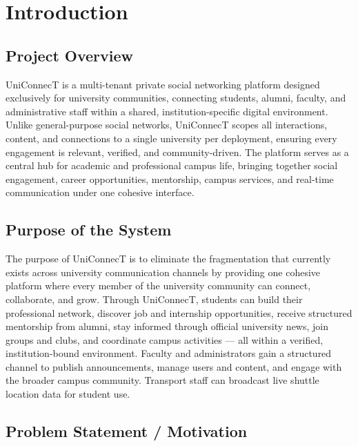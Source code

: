 \documentclass[12pt, a4paper]{article}
\begin{document}
\section{Introduction}

\subsection{Project Overview}

UniConnecT is a multi-tenant private social networking platform designed exclusively for
university communities, connecting students, alumni, faculty, and administrative staff
within a shared, institution-specific digital environment. Unlike general-purpose social
networks, UniConnecT scopes all interactions, content, and connections to a single
university per deployment, ensuring every engagement is relevant, verified, and
community-driven. The platform serves as a central hub for academic and professional
campus life, bringing together social engagement, career opportunities, mentorship,
campus services, and real-time communication under one cohesive interface.

\subsection{Purpose of the System}

The purpose of UniConnecT is to eliminate the fragmentation that currently exists across
university communication channels by providing one cohesive platform where every member
of the university community can connect, collaborate, and grow. Through UniConnecT,
students can build their professional network, discover job and internship opportunities,
receive structured mentorship from alumni, stay informed through official university news,
join groups and clubs, and coordinate campus activities --- all within a verified,
institution-bound environment. Faculty and administrators gain a structured channel to
publish announcements, manage users and content, and engage with the broader campus
community. Transport staff can broadcast live shuttle location data for student use.

\subsection{Problem Statement / Motivation}
\end{document}
